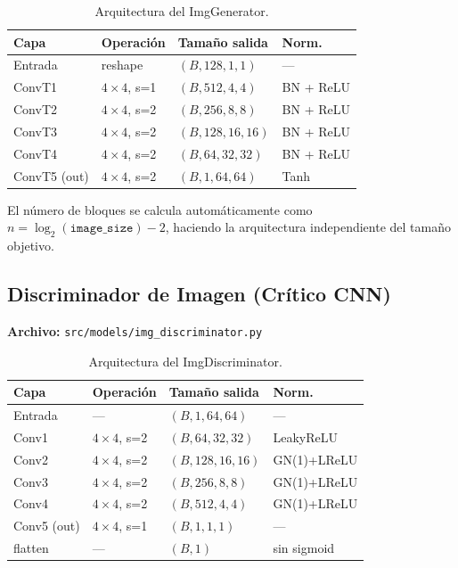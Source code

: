 \documentclass[a4paper,11pt]{article}
\begin{document}
\begin{table}[H]
    \centering
    \caption{Arquitectura del ImgGenerator.}
    \label{tab:imggen}
    \begin{tabular}{@{}llll@{}}
        \toprule
        \textbf{Capa} & \textbf{Operación} & \textbf{Tamaño salida} & \textbf{Norm.} \\
        \midrule
        Entrada       & reshape            & $(B,128,1,1)$          & —              \\
        ConvT1        & $4\times4$, s=1    & $(B,512,4,4)$          & BN + ReLU      \\
        ConvT2        & $4\times4$, s=2    & $(B,256,8,8)$          & BN + ReLU      \\
        ConvT3        & $4\times4$, s=2    & $(B,128,16,16)$        & BN + ReLU      \\
        ConvT4        & $4\times4$, s=2    & $(B,64,32,32)$         & BN + ReLU      \\
        ConvT5 (out)  & $4\times4$, s=2    & $(B,1,64,64)$          & Tanh           \\
        \bottomrule
    \end{tabular}
\end{table}

El número de bloques se calcula automáticamente como
$n = \log_2(\texttt{image\_size})-2$, haciendo la arquitectura
independiente del tamaño objetivo.

\subsection{Discriminador de Imagen (Crítico CNN)}

\textbf{Archivo:} \texttt{src/models/img\_discriminator.py}

\begin{table}[H]
    \centering
    \caption{Arquitectura del ImgDiscriminator.}
    \label{tab:imgdisc}
    \begin{tabular}{@{}llll@{}}
        \toprule
        \textbf{Capa} & \textbf{Operación} & \textbf{Tamaño salida} & \textbf{Norm.} \\
        \midrule
        Entrada       & —                  & $(B,1,64,64)$          & —              \\
        Conv1         & $4\times4$, s=2    & $(B,64,32,32)$         & LeakyReLU      \\
        Conv2         & $4\times4$, s=2    & $(B,128,16,16)$        & GN(1)+LReLU    \\
        Conv3         & $4\times4$, s=2    & $(B,256,8,8)$          & GN(1)+LReLU    \\
        Conv4         & $4\times4$, s=2    & $(B,512,4,4)$          & GN(1)+LReLU    \\
        Conv5 (out)   & $4\times4$, s=1    & $(B,1,1,1)$            & —              \\
        flatten       & —                  & $(B,1)$                & sin sigmoid    \\
        \bottomrule
    \end{tabular}
\end{table}
\end{document}
